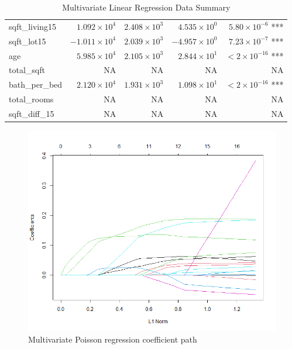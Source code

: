 \documentclass[a4paper, 11pt]{article}
\begin{document}
\begin{table}[ht]
\begin{tabular}{|l|r|r|r|r|}
sqft\_living15    & $1.092 \times 10^{4}$  & $2.408 \times 10^{3}$  & $4.535 \times 10^{0}$  & $5.80 \times 10^{-6}$ ***   \\
sqft\_lot15       & $-1.011 \times 10^{4}$ & $2.039 \times 10^{3}$  & $-4.957 \times 10^{0}$ & $7.23 \times 10^{-7}$ ***   \\
age               & $5.985 \times 10^{4}$  & $2.105 \times 10^{3}$  & $2.844 \times 10^{1}$  & $< 2 \times 10^{-16}$ ***  \\
total\_sqft       & NA          & NA         & NA         & NA             \\
bath\_per\_bed    & $2.120 \times 10^{4}$  & $1.931 \times 10^{3}$  & $1.098 \times 10^{1}$  & $< 2 \times 10^{-16}$ ***  \\
total\_rooms      & NA          & NA         & NA         & NA             \\
sqft\_diff\_15    & NA          & NA         & NA         & NA             \\
\hline
\end{tabular}
\caption{Multivariate Linear Regression Data Summary}
\label{tab:mlrcoeffs}
\end{table}


\begin{figure}[H]
\includegraphics[scale=0.55]{MGLMcoefpath}
\centering
\caption{Multivariate Poisson regression coefficient path}
\label{fig:MGLMcoefpath}
\end{figure}
\end{document}
